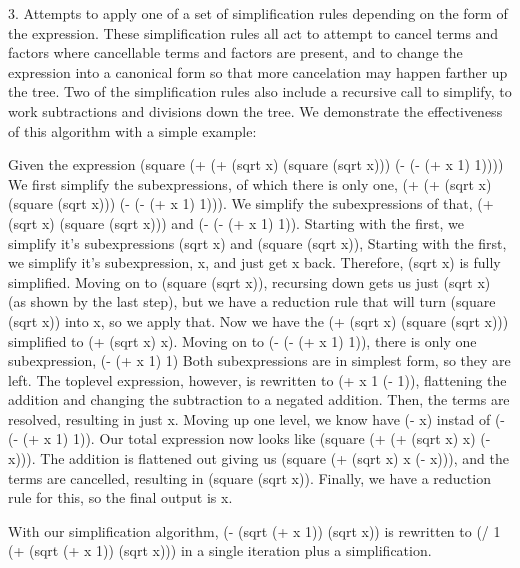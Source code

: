 \documentclass{article}
\begin{document}
3. Attempts to apply one 
of a set of simplification rules 
depending on the form of the expression. 
These simplification rules 
all act to attempt to cancel terms and factors 
where cancellable terms and factors are present, 
and to change the expression into a canonical form 
so that more cancelation may happen 
farther up the tree. 
Two of the simplification rules 
also include a recursive call to simplify, 
to work subtractions and divisions down the tree.
We demonstrate the effectiveness of this algorithm 
with a simple example:

Given the expression 
(square (+ (+ (sqrt x) (square (sqrt x))) (- (- (+ x 1) 1))))
We first simplify the subexpressions, 
of which there is only one, 
(+ (+ (sqrt x) (square (sqrt x))) (- (- (+ x 1) 1))).
We simplify the subexpressions of that, 
(+ (sqrt x) (square (sqrt x))) 
and (- (- (+ x 1) 1)).
Starting with the first, 
we simplify it's subexpressions 
(sqrt x) and 
(square (sqrt x)),
Starting with the first, 
we simplify it's subexpression, 
x, 
and just get x back. 
Therefore, 
(sqrt x) 
is fully simplified.
Moving on to 
(square (sqrt x)), 
recursing down 
gets us just (sqrt x) 
(as shown by the last step), 
but we have a reduction rule 
that will turn (square (sqrt x)) into x, 
so we apply that.
Now we have the (+ (sqrt x) (square (sqrt x))) 
simplified to (+ (sqrt x) x).
Moving on to (- (- (+ x 1) 1)), 
there is only one subexpression, 
(- (+ x 1) 1)
Both subexpressions 
are in simplest form, 
so they are left. 
The toplevel expression, 
however, 
is rewritten to (+ x 1 (- 1)), 
flattening the addition 
and changing the subtraction 
to a negated addition. 
Then, the terms are resolved, 
resulting in just x.
Moving up one level, 
we know have (- x) instad of (- (- (+ x 1) 1)).
Our total expression now looks like 
(square (+ (+ (sqrt x) x) (- x))). 
The addition is flattened out 
giving us (square (+ (sqrt x) x (- x))), 
and the terms are cancelled, 
resulting in (square (sqrt x)). 
Finally, we have a reduction rule for this, 
so the final output is x.

With our simplification algorithm, 
(- (sqrt (+ x 1)) (sqrt x)) 
is rewritten to 
(/ 1 (+ (sqrt (+ x 1)) (sqrt x)))
 in a single iteration 
plus a simplification.
\end{document}
